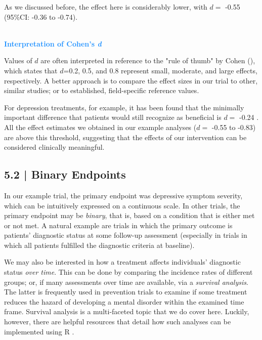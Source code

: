 As we discussed before, the effect here is considerably lower, with $d=$ -0.55 (95\%CI: -0.36 to -0.74). 

\begin{box-info} \\
\textcolor{dodgerblue}{\textbf{Interpretation of Cohen's \emph{d}}} 

\vspace{2mm}

Values of $d$ are often interpreted in reference to the "rule of thumb" by Cohen (\citeyear{cohen2013statistical}), which states that $d$=0.2, 0.5, and 0.8 represent small, moderate, and large effects, respectively. A better approach is to compare the effect sizes in our trial to other, similar studies; or to established, field-specific reference values. 

\vspace{2mm}

\hspace*{5mm} For depression treatments, for example, it has been found that the minimally important difference that patients would still recognize as beneficial is $d=$ -0.24 \citep{cuijpers2014threshold}. All the effect estimates we obtained in our example analyses ($d=$ -0.55 to -0.83) are above this threshold, suggesting that the effects of our intervention can be considered clinically meaningful.
\end{box-info}


\subsection{{\normalfont\textsf{\textcolor{sBlue}{\small 5.2 |}}} Binary Endpoints}

In our example trial, the primary endpoint was depressive symptom severity, which can be intuitively expressed on a continuous scale. In other trials, the primary endpoint may be \emph{binary}, that is, based on a condition that is either met or not met. A natural example are trials in which the primary outcome is patients' diagnostic status at some follow-up assessment (especially in trials in which all patients fulfilled the diagnostic criteria at baseline). 

We may also be interested in how a treatment affects individuals' diagnostic status \emph{over time}. This can be done by comparing the incidence rates of different groups; or, if many assessments over time are available, via a \emph{survival analysis}. The latter is frequently used in prevention trials to examine if some treatment reduces the hazard of developing a mental disorder within the examined time frame. Survival analysis is a multi-faceted topic that we do cover here. Luckily, however, there are helpful resources that detail how such analyses can be implemented using \textsf{R} \citep{moore2016applied}.

